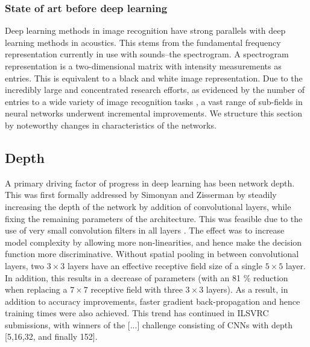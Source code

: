 \documentclass[12pt]{llncs}
\newcommand{\ikN}[1]{\todo[inline, size=\small, color=orange!30]{[ik] #1}}
\begin{document}
\subsubsection{State of art before deep learning}
\ikN{Describe briefly}
Deep learning methods in image recognition have strong parallels with deep learning methods in acoustics. This stems from the fundamental frequency representation currently in use with sounds--the spectrogram. A spectrogram representation is a two-dimensional matrix with intensity measurements as entries. This is equivalent to a black and white image representation. Due to the incredibly large and concentrated research efforts, as evidenced by the number of entries to a wide variety of image recognition tasks \cite{russakovsky2014imagenet,ILSVRC15}, a vast range of sub-fields in neural networks underwent incremental improvements. We structure this section by noteworthy changes in characteristics of the networks.

\subsection{Depth}
A primary driving factor of progress in deep learning has been network depth. This was first formally addressed by Simonyan and Zisserman by steadily increasing the depth of the network by addition of convolutional layers, while fixing the remaining parameters of the architecture. This was feasible due to the use of very small convolution filters in all layers \cite{simonyan2014very}. The effect was to increase model complexity by allowing more non-linearities, and hence make the decision function more discriminative. Without spatial pooling in between convolutional layers, two $3 \times 3$ layers have an effective receptive field size of a single $5 \times 5$ layer. In addition, this results in a decrease of parameters (with an 81 \% reduction when replacing a $7 \times 7$ receptive field with three $3\times3$ layers). As a result, in addition to accuracy improvements, faster gradient back-propagation and hence training times were also achieved. This trend has continued in ILSVRC submissions, with winners of the [...] challenge consisting of CNNs with depth [5,16,32, and finally 152].
\end{document}
